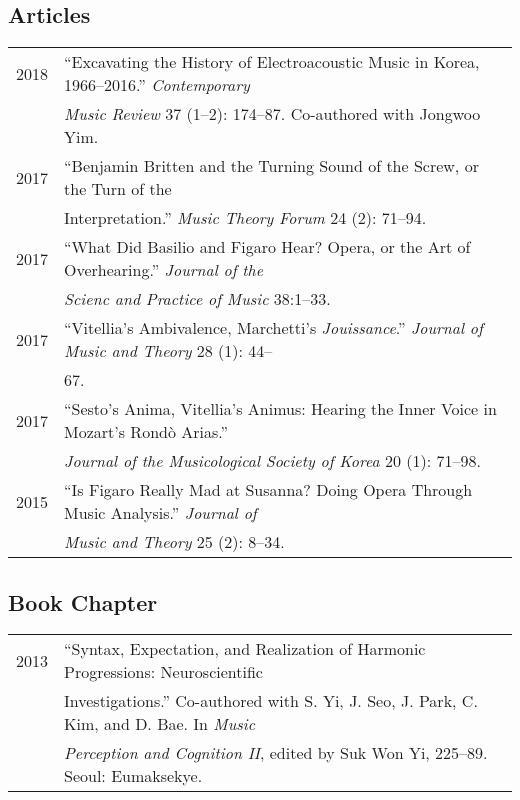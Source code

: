 \documentclass[letter,11pt,draft]{article}
\begin{document}
  \subsection*{Articles}
  \hspace*{-0.25cm}
  \begin{tabular}{p{2.5cm} p{12.5cm}}
    2018 & ``Excavating the History of Electroacoustic Music in Korea,
    1966--2016.'' \textit{Contemporary}\\
    & \textit{Music Review} 37 (1--2): 174--87. Co-authored with Jongwoo
    Yim.\\[2mm]
    
    2017 & ``Benjamin Britten and the Turning Sound of the Screw, or the Turn
    of the\\
    & Interpretation.'' \textit{Music Theory Forum} 24 (2): 71--94.\\[2mm]
    
    2017 & ``What Did Basilio and Figaro Hear? Opera, or the Art of
    Overhearing.'' \textit{Journal of the}\\
    & \textit{Scienc and Practice of Music} 38:1--33.\\[2mm]
    
    2017 & ``Vitellia's Ambivalence, Marchetti's \textit{Jouissance}.''
    \textit{Journal of Music and Theory} 28 (1): 44--\\
    & 67.\\[2mm]
    
    2017 & ``Sesto's Anima, Vitellia's Animus: Hearing the Inner Voice in
    Mozart's Rond\`{o} Arias.''\\
    & \textit{Journal of the Musicological Society of Korea} 20 (1):
    71--98.\\[2mm]
    
    2015 & ``Is Figaro Really Mad at Susanna? Doing Opera Through Music
    Analysis.'' \textit{Journal of}\\
    & \textit{Music and Theory} 25 (2): 8--34.
  \end{tabular}
    
  \subsection*{Book Chapter}
  \hspace*{-0.25cm}
  \begin{tabular}{p{2.5cm} p{12.5cm}}
    2013 & “Syntax, Expectation, and Realization of Harmonic Progressions:
    Neuroscientific\\
    & Investigations.” Co-authored with S. Yi, J. Seo, J. Park, C. Kim, and D.
    Bae. In \textit{Music} \\
    & \textit{Perception and Cognition II}, edited by Suk Won Yi, 225–89.
    Seoul: Eumaksekye.
  \end{tabular}
    
\end{document}
